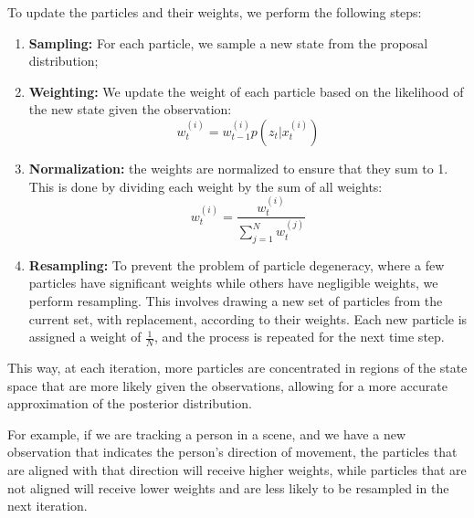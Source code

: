To update the particles and their weights, we perform the following steps:
\begin{enumerate}
    \item \textbf{Sampling:} For each particle, we sample a new state from the proposal distribution;
    \item \textbf{Weighting:} We update the weight of each particle based on the likelihood of the new state given the observation:
    $$w_t^{(i)} = w_{t-1}^{(i)} p(z_t | x_t^{(i) })$$
    \item \textbf{Normalization:} the weights are normalized to ensure that they sum to 1. This is done by dividing
    each weight by the sum of all weights:
    $$w_t^{(i)} = \frac{w_t^{(i)}}{\sum_{j=1}^N w_t^{(j)}}$$
    \item \textbf{Resampling:} To prevent the problem of particle degeneracy, where a few particles have significant weights while others have negligible weights, we perform resampling.
    This involves drawing a new set of particles from the current set, with replacement, according to their weights.
    Each new particle is assigned a weight of $\frac{1}{N}$, and the process is repeated for the next time step.
\end{enumerate}
This way, at each iteration, more particles are concentrated in regions of the state space that are more likely given the observations, allowing for a more accurate approximation of the posterior distribution.

For example, if we are tracking a person in a scene, and we have a new observation that indicates the person's direction of movement, the particles
that are aligned with that direction will receive higher weights, while particles that are not aligned will receive lower weights and are less likely to be resampled in the next iteration.
